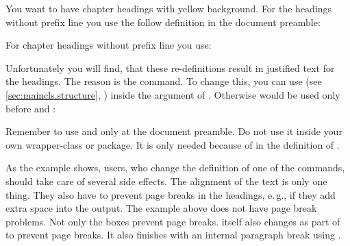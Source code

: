\begin{Example}
  You want to have chapter headings with yellow background. For the headings
  without prefix line you use the follow definition in the document preamble:
\begin{lstcode}
  \makeatletter
  \renewcommand{\chapterlinesformat}[3]{%
    \colorbox{yellow}{%
      \parbox{\dimexpr\linewidth-2\fboxrule-2\fboxsep}{%
        \@hangfrom{#2}#3%
      }%
    }%
  }
  \makeatother
\end{lstcode}
  For chapter headings without prefix line you use:
\begin{lstcode}
  \renewcommand{\chapterlineswithprefixformat}[3]{%
    \colorbox{yellow}{%
      \parbox{\dimexpr\linewidth-2\fboxrule-2\fboxsep}{%
        #2#3%
      }%
    }%
  }
\end{lstcode}
  Unfortunately you will find, that these re-definitions result in justified
  text for the headings. The reason is the  command. To change
  this, you can use  (see \autoref{sec:maincls.structure},
  ) inside the argument of
  . Otherwise  would be used only before
   and :
\begin{lstcode}
  \makeatletter
  \renewcommand{\chapterlinesformat}[3]{%
    \colorbox{yellow}{%
      \parbox{\dimexpr\linewidth-2\fboxrule-2\fboxsep}{%
        \raggedchapter
        \@hangfrom{#2}#3%
      }%
    }%
  }
  \makeatother
  \renewcommand{\chapterlineswithprefixformat}[3]{%
    \colorbox{yellow}{%
      \parbox{\dimexpr\linewidth-2\fboxrule-2\fboxsep}{%
        \raggedchapter
        #2#3%
      }%
    }%
  }
\end{lstcode}
  Remember to use  and  only at the
  document preamble. Do not use it inside your own wrapper-class or
  package. It is only needed because of  in the definition of
  .
\end{Example}

As the example shows, users, who change the definition of one of the commands,
should take care of several side effects. The alignment of the text is only
one thing. They also have to prevent page breaks in the headings, e.\,g., if
they add extra space into the output. The example above does not have page
break problems. Not only the boxes prevent page breaks. \KOMAScript{} itself
also changes  as part of  to prevent page
breaks. It also finishes  with an internal paragraph break using
.

